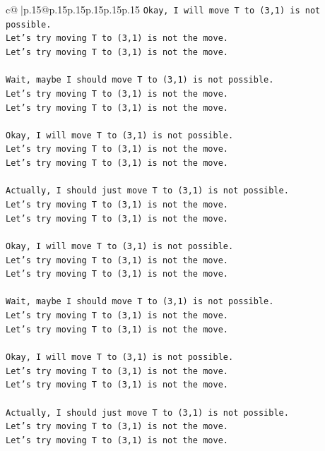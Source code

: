\documentclass{article}
\begin{document}
{\begin{supertabular}{c@{$\;$}|p{.15\linewidth}@{}p{.15\linewidth}p{.15\linewidth}p{.15\linewidth}p{.15\linewidth}p{.15\linewidth}}
{{{\texttt{Okay, I will move T to (3,1) is not possible.} \\
\texttt{Let's try moving T to (3,1) is not the move.} \\
\texttt{Let's try moving T to (3,1) is not the move.} \\
\\ 
\texttt{Wait, maybe I should move T to (3,1) is not possible.} \\
\texttt{Let's try moving T to (3,1) is not the move.} \\
\texttt{Let's try moving T to (3,1) is not the move.} \\
\\ 
\texttt{Okay, I will move T to (3,1) is not possible.} \\
\texttt{Let's try moving T to (3,1) is not the move.} \\
\texttt{Let's try moving T to (3,1) is not the move.} \\
\\ 
\texttt{Actually, I should just move T to (3,1) is not possible.} \\
\texttt{Let's try moving T to (3,1) is not the move.} \\
\texttt{Let's try moving T to (3,1) is not the move.} \\
\\ 
\texttt{Okay, I will move T to (3,1) is not possible.} \\
\texttt{Let's try moving T to (3,1) is not the move.} \\
\texttt{Let's try moving T to (3,1) is not the move.} \\
\\ 
\texttt{Wait, maybe I should move T to (3,1) is not possible.} \\
\texttt{Let's try moving T to (3,1) is not the move.} \\
\texttt{Let's try moving T to (3,1) is not the move.} \\
\\ 
\texttt{Okay, I will move T to (3,1) is not possible.} \\
\texttt{Let's try moving T to (3,1) is not the move.} \\
\texttt{Let's try moving T to (3,1) is not the move.} \\
\\ 
\texttt{Actually, I should just move T to (3,1) is not possible.} \\
\texttt{Let's try moving T to (3,1) is not the move.} \\
\texttt{Let's try moving T to (3,1) is not the move.} \\
}}}
\end{supertabular}}
\end{document}

